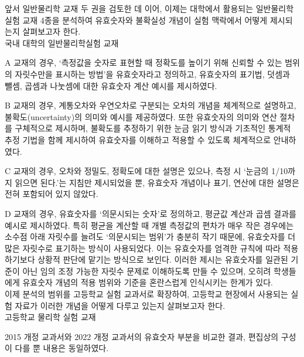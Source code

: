 앞서 일반물리학 교재 두 권을 검토한 데 이어,
이제는 대학에서 활용되는 일반물리학실험 교재 4종을 분석하여
유효숫자와 불확실성 개념이 실험 맥락에서 어떻게 제시되는지 살펴보고자 한다. \\

\ganada 국내 대학의 일반물리학실험 교재


A 교재의 경우,
`측정값을 숫자로 표현할 때 정확도를 높이기 위해 신뢰할 수 있는 범위의
자릿수만을 표시하는 방법'을 유효숫자라고 정의하고,
유효숫자의 표기법, 덧셈과 뺄셈, 곱셈과 나눗셈에 대한 유효숫자 계산 예시를 제시하였다.

B 교재의 경우,
계통오차와 우연오차로 구분되는 오차의 개념을 체계적으로 설명하고,
불확도(uncertainty)의 의미와 예시를 제공하였다.
또한 유효숫자의 의미와 연산 절차를 구체적으로 제시하며,
불확도를 추정하기 위한 눈금 읽기 방식과
기초적인 통계적 추정 기법을 함께 제시하여 유효숫자를 이해하고
적용할 수 있도록 체계적으로 안내하였다.

C 교재의 경우,
오차와 정밀도, 정확도에 대한 설명은 있으나, 측정 시 `눈금의 1/10까지 읽으면 된다.'는
지침만 제시되었을 뿐, 유효숫자 개념이나 표기, 연산에 대한 설명은 전혀 포함되어 있지 않았다.

D 교재의 경우,
유효숫자를 `의문시되는 숫자'로 정의하고, 평균값 계산과 곱셈 결과를 예시로 제시하였다.
특히 평균을 계산할 때 개별 측정값의 편차가 매우 작은 경우에는 소수점 아래 자릿수를 늘려도
`의문시되는 범위'가 충분히 작기 때문에, 유효숫자를 더 많은 자릿수로 표기하는 방식이 사용되었다.
이는 유효숫자를 엄격한 규칙에 따라 적용하기보다 상황적 판단에 맡기는 방식으로 보인다.
이러한 제시는 유효숫자를 일관된 기준이 아닌 임의 조정 가능한 자릿수 문제로 이해하도록 만들 수 있으며,
오히려 학생들에게 유효숫자 개념의 적용 범위와 기준을 혼란스럽게 인식시키는 한계가 있다. \\

이제 분석의 범위를 고등학교 실험 교과서로 확장하여,
고등학교 현장에서 사용되는 실험 자료가 이러한 개념을 어떻게 다루고 있는지 살펴보고자 한다. \\

\ganada 고등학교 물리학 실험 교재

2015 개정 교과서와 2022 개정 교과서의 유효숫자 부분을 비교한 결과,
편집상의 구성이 다를 뿐 내용은 동일하였다.

